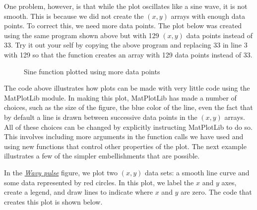 \documentclass[letterpaper,10pt,english]{sphinxmanual}
\begin{document}
One problem, however, is that while the plot oscillates like a sine wave, it is not smooth.  This is because we did not create the \((x,y)\) arrays with enough data points.  To correct this, we need more data points.  The plot below was created using the same program shown above but with 129 \((x,y)\) data points instead of 33.  Try it out your self by copying the above program and replacing 33 in line 3 with 129 so that the function  creates an array with 129 data points instead of 33.
\begin{figure}[htbp]
\centering
\capstart

\caption{Sine function plotted using more data points}\label{chap5/chap5_plot:fig-sineplotdenserxy}\end{figure}

The code above illustrates how plots can be made with very little code using the MatPlotLib module.  In making this plot, MatPlotLib has made a number of choices, such as the size of the figure, the blue color of the line, even the fact that by default a line is drawn between successive data points in the \((x,y)\) arrays.  All of these choices can be changed by explicitly instructing MatPlotLib to do so.  This involves including more arguments in the function calls we have used and using new functions that control other properties of the plot.  The next example illustrates a few of the simpler embellishments that are possible.

In the {\hyperref[chap5/chap5_plot:fig-wavypulse]{\emph{Wavy pulse}}} figure, we plot two \((x,y)\) data sets: a smooth line curve and some data represented by red circles.  In this plot, we label the \(x\) and \(y\) axes, create a legend, and draw lines to indicate where \(x\) and \(y\) are zero.  The code that creates this plot is shown below.
\end{document}
